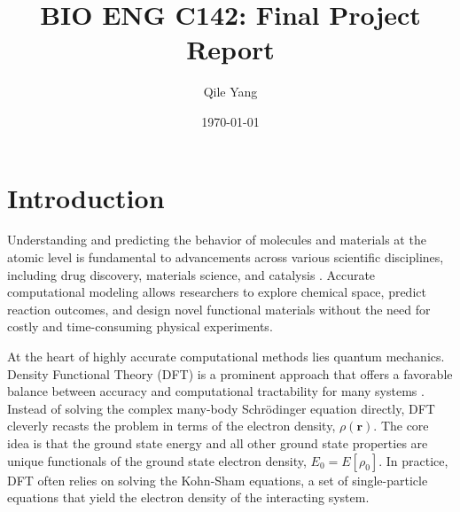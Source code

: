 \documentclass[11pt, twocolumn]{article}
\newcommand \myabstract[2][.8]{%
  \renewcommand\maketitlehookd{%
    \mbox{}\medskip\par
    \centering
    \begin{minipage}{#1\textwidth}
      #2
    \end{minipage}}}
\begin{document}
\author{Qile Yang}
\title{BIO ENG C142: Final Project Report}
\date{\today}
\myabstract{I introduce a streamlined machine-learning potential that delivers density-functional accuracy for small CHON molecules at force-field speed. Using the ANI Atomic Environment Vector descriptor and TorchANI, I trained element-specific feed-forward networks on a curated GDB subset. An architecture sweep identified a single-hidden-layer model (128 neurons per element; 197K parameters) as the best. With Adam optimisation, the model attains an RMSE of 1.03 kcal on an unseen test set while retaining laptop-scale training (~minutes on an RTX 3050). ReLU activations outperformed CELU variants. Overall, a much more compressed model than the original ANI-1 potential was achieved, with a similar performance on the small organic molecule dataset.}

\maketitle

\section{Introduction}

Understanding and predicting the behavior of molecules and materials at the atomic level is fundamental to advancements across various scientific disciplines, including drug discovery, materials science, and catalysis \cite{wang2018silico, dominy2004native, cicaloni2019applications}. Accurate computational modeling allows researchers to explore chemical space, predict reaction outcomes, and design novel functional materials without the need for costly and time-consuming physical experiments.

At the heart of highly accurate computational methods lies quantum mechanics. Density Functional Theory (DFT) is a prominent approach that offers a favorable balance between accuracy and computational tractability for many systems \cite{engel2011density}. Instead of solving the complex many-body Schrödinger equation directly, DFT cleverly recasts the problem in terms of the electron density, $\rho(\mathbf{r})$. The core idea is that the ground state energy and all other ground state properties are unique functionals of the ground state electron density, $E_0 = E[\rho_0]$. In practice, DFT often relies on solving the Kohn-Sham equations, a set of single-particle equations that yield the electron density of the interacting system.
\end{document}
